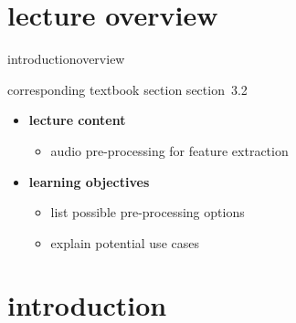 


\subtitle{module 3.2: audio pre-processing}


	

    \section[overview]{lecture overview}
        \begin{frame}{introduction}{overview}
            \begin{block}{corresponding textbook section}
                section~3.2
            \end{block}

            \begin{itemize}
                \item   \textbf{lecture content}
                    \begin{itemize}
                        \item   audio pre-processing for feature extraction
                    \end{itemize}
                \bigskip
                \item<2->   \textbf{learning objectives}
                    \begin{itemize}
                        \item   list possible pre-processing options 
                        \item   explain potential use cases
                    \end{itemize}
            \end{itemize}
        \end{frame}

    \section[intro]{introduction}
